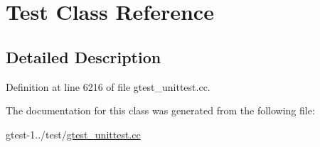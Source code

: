 \hypertarget{classmy__namespace_1_1testing_1_1Test}{\section{\-Test \-Class \-Reference}
\label{de/dd2/classmy__namespace_1_1testing_1_1Test}
}


\subsection{\-Detailed \-Description}


\-Definition at line 6216 of file gtest\-\_\-unittest.\-cc.



\-The documentation for this class was generated from the following file\-:\begin{DoxyCompactItemize}
\item 
gtest-\/1../test/\hyperlink{gtest__unittest_8cc}{gtest\-\_\-unittest.\-cc}\end{DoxyCompactItemize}
